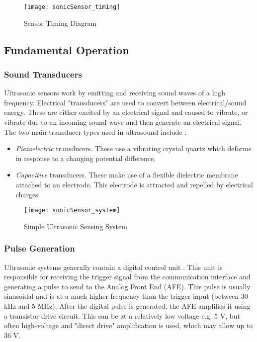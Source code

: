 \begin{figure}[!htb]
  \centering
  \texttt{[image: sonicSensor\_timing]}
  \caption{Sensor Timing Diagram \cite{datasheetHCSR04}}
  \label{fig:sonicSensor_timing}
\end{figure}

\subsection{Fundamental Operation}

\subsubsection{Sound Transducers}

Ultrasonic sensors work by emitting and receiving sound waves of a high frequency. Electrical "transducers" are used to convert between electrical/sound energy.
These are either excited by an electrical signal and caused to vibrate, or vibrate due to an incoming sound-wave and then generate an electrical signal.
The two main transducer types used in ultrasound include \cite{ultrasonicSensorWorkings}:
\begin{itemize}
    \item \textit{Piezoelectric} transducers. These use a vibrating crystal quartz which deforms in response to a changing potential difference.
    \item \textit{Capacitive} transducers. These make use of a flexible dielectric membrane attached to an electrode. This electrode is attracted and repelled
          by electrical charges.
\end{itemize}

\begin{figure}[!htb]
    \centering
    \texttt{[image: sonicSensor\_system]}
    \caption{Simple Ultrasonic Sensing System \cite{ultrasonicSensorBasics}}
    \label{fig:sonicSensor_system}
  \end{figure}

\subsubsection{Pulse Generation}

Ultrasonic systems generally contain a digital control unit \cite{ultrasonicSensorBasics}. This unit is responsible for receiving the trigger signal from the communication interface and generating
a pulse to send to the Analog Front End (AFE). This pulse is usually sinusoidal and is at a much higher frequency than the trigger input (between 30 kHz and 5 MHz).
After the digital pulse is generated, the AFE amplifies it using a transistor drive circuit.
This can be at a relatively low voltage e.g. 5 V, but often high-voltage and "direct drive" amplification is used, which may allow up to 36 V.

